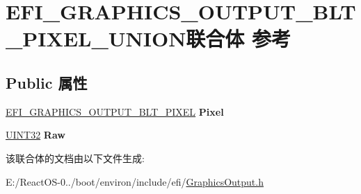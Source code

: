 \hypertarget{union_e_f_i___g_r_a_p_h_i_c_s___o_u_t_p_u_t___b_l_t___p_i_x_e_l___u_n_i_o_n}{}\section{E\+F\+I\+\_\+\+G\+R\+A\+P\+H\+I\+C\+S\+\_\+\+O\+U\+T\+P\+U\+T\+\_\+\+B\+L\+T\+\_\+\+P\+I\+X\+E\+L\+\_\+\+U\+N\+I\+O\+N联合体 参考}
\label{union_e_f_i___g_r_a_p_h_i_c_s___o_u_t_p_u_t___b_l_t___p_i_x_e_l___u_n_i_o_n}
\subsection*{Public 属性}
\begin{DoxyCompactItemize}
\item 
\mbox{\label{union_e_f_i___g_r_a_p_h_i_c_s___o_u_t_p_u_t___b_l_t___p_i_x_e_l___u_n_i_o_n_a1e0c2fa0dae1c6cc311d1759549c8630}} 
\hyperlink{struct_e_f_i___g_r_a_p_h_i_c_s___o_u_t_p_u_t___b_l_t___p_i_x_e_l}{E\+F\+I\+\_\+\+G\+R\+A\+P\+H\+I\+C\+S\+\_\+\+O\+U\+T\+P\+U\+T\+\_\+\+B\+L\+T\+\_\+\+P\+I\+X\+EL} {\bfseries Pixel}
\item 
\mbox{\label{union_e_f_i___g_r_a_p_h_i_c_s___o_u_t_p_u_t___b_l_t___p_i_x_e_l___u_n_i_o_n_a3da794231040c98f2faec197b1849d0e}} 
\hyperlink{_processor_bind_8h_ae1e6edbbc26d6fbc71a90190d0266018}{U\+I\+N\+T32} {\bfseries Raw}
\end{DoxyCompactItemize}


该联合体的文档由以下文件生成\+:\begin{DoxyCompactItemize}
\item 
E\+:/\+React\+O\+S-\/0../boot/environ/include/efi/\hyperlink{_graphics_output_8h}{Graphics\+Output.\+h}\end{DoxyCompactItemize}
